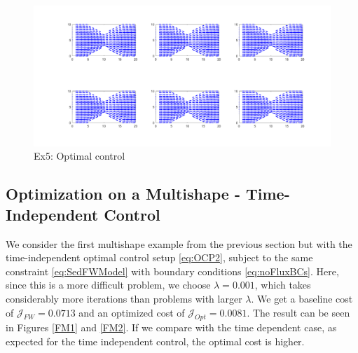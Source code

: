 \documentclass[final]{siamltex}
\begin{document}
\begin{figure}[h]
	\centering
	\includegraphics[scale=0.25]{MultiCont3.png}
	\caption{Ex5: Optimal control} 
	\label{FM3b}
\end{figure}

\subsection{Optimization on a Multishape - Time-Independent Control}
We consider the first multishape example from the previous section but with the time-independent optimal control setup \eqref{eq:OCP2}, subject to the same constraint \eqref{eq:SedFWModel} with boundary conditions \eqref{eq:noFluxBCs}. Here, since this is a more difficult problem, we choose $\lambda = 0.001$, which takes considerably more iterations than problems with larger $\lambda$.
We get a baseline cost of $\mathcal J_{FW} = 0.0713$ and an optimized cost of $\mathcal J_{Opt} = 0.0081$. The result can be seen in Figures \ref{FM1} and \ref{FM2}. If we compare with the time dependent case, as expected for the time independent control, the optimal cost is higher.
\end{document}
